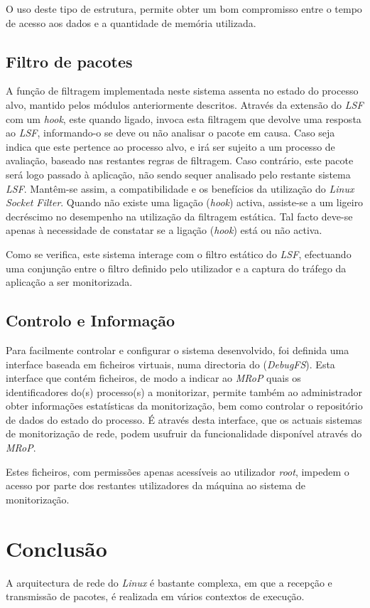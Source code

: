 O uso deste tipo de estrutura, permite obter um bom compromisso entre o tempo de acesso aos dados e a quantidade de memória utilizada.

\subsection{Filtro de pacotes}
\label{sub:packet_filter}

A função de filtragem implementada neste sistema assenta no estado do processo alvo, mantido pelos módulos anteriormente descritos.
Através da extensão do \textit{LSF} com um \textit{hook}, este quando ligado, invoca esta filtragem que devolve uma resposta ao \textit{LSF}, informando-o se deve ou não analisar o pacote em causa.
Caso seja indica que este pertence ao processo alvo, e irá ser sujeito a um processo de avaliação, baseado nas restantes regras de filtragem.
Caso contrário, este pacote será logo passado à aplicação, não sendo sequer analisado pelo restante sistema \textit{LSF}.
Mantêm-se assim, a compatibilidade e os benefícios da utilização do \textit{Linux Socket Filter}.
Quando não existe uma ligação (\textit{hook}) activa, assiste-se a um ligeiro decréscimo no desempenho na utilização da filtragem estática.
Tal facto deve-se apenas à necessidade de constatar se a ligação (\textit{hook}) está ou não activa.

Como se verifica, este sistema interage com o filtro estático do \textit{LSF}, efectuando uma conjunção entre o filtro definido pelo utilizador e a captura do tráfego da aplicação a ser monitorizada.

\subsection{Controlo e Informação}
\label{sub:data_information}

Para facilmente controlar e configurar o sistema desenvolvido, foi definida uma interface baseada em ficheiros virtuais, numa directoria do (\textit{DebugFS}).
Esta interface que contém ficheiros, de modo a indicar ao \textit{MRoP} quais os identificadores do(s) processo(s) a monitorizar, permite também ao administrador obter informações estatísticas da monitorização, bem como controlar o repositório de dados do estado do processo.
É através desta interface, que os actuais sistemas de monitorização de rede, podem usufruir da funcionalidade disponível através do \textit{MRoP}.

Estes ficheiros, com permissões apenas acessíveis ao utilizador \textit{root}, impedem o acesso por parte dos restantes utilizadores da máquina ao sistema de monitorização.

\section{Conclusão}

A arquitectura de rede do \textit{Linux} é bastante complexa, em que a recepção e transmissão de pacotes, é realizada em vários contextos de execução.
